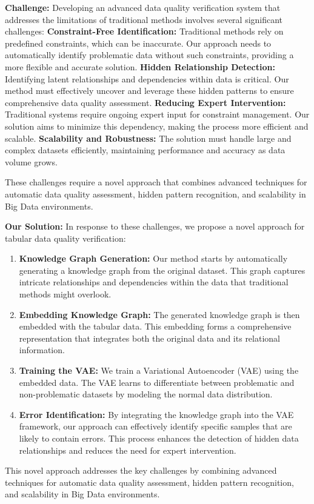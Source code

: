 \noindent\textbf{Challenge:} Developing an advanced data quality verification system that addresses the limitations of traditional methods involves several significant challenges:
\textbf{Constraint-Free Identification:} Traditional methods rely on predefined constraints, which can be inaccurate. Our approach needs to automatically identify problematic data without such constraints, providing a more flexible and accurate solution.
\textbf{Hidden Relationship Detection:} Identifying latent relationships and dependencies within data is critical. Our method must effectively uncover and leverage these hidden patterns to ensure comprehensive data quality assessment.
\textbf{Reducing Expert Intervention:} Traditional systems require ongoing expert input for constraint management. Our solution aims to minimize this dependency, making the process more efficient and scalable.
\textbf{Scalability and Robustness:} The solution must handle large and complex datasets efficiently, maintaining performance and accuracy as data volume grows.

These challenges require a novel approach that combines advanced techniques for automatic data quality assessment, hidden pattern recognition, and scalability in Big Data environments.



\noindent\textbf{Our Solution:} In response to these challenges, we propose a novel approach for tabular data quality verification:
\begin{enumerate}[leftmargin=*]
    \item \textbf{Knowledge Graph Generation:} Our method starts by automatically generating a knowledge graph from the original dataset. This graph captures intricate relationships and dependencies within the data that traditional methods might overlook.
    \item \textbf{Embedding Knowledge Graph:} The generated knowledge graph is then embedded with the tabular data. This embedding forms a comprehensive representation that integrates both the original data and its relational information.
    \item \textbf{Training the VAE:} We train a Variational Autoencoder (VAE) using the embedded data. The VAE learns to differentiate between problematic and non-problematic datasets by modeling the normal data distribution.
    \item \textbf{Error Identification:} By integrating the knowledge graph into the VAE framework, our approach can effectively identify specific samples that are likely to contain errors. This process enhances the detection of hidden data relationships and reduces the need for expert intervention.
\end{enumerate}
This novel approach addresses the key challenges by combining advanced techniques for automatic data quality assessment, hidden pattern recognition, and scalability in Big Data environments.


